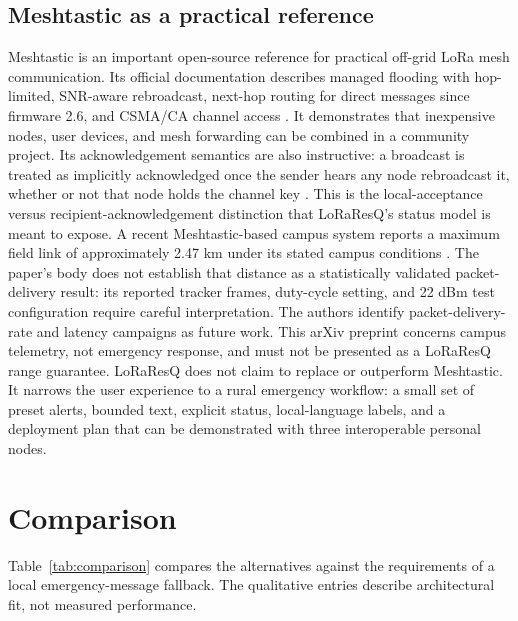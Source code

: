 \documentclass[journal]{IEEEtran}
\begin{document}
\subsection{Meshtastic as a practical reference}
Meshtastic is an important open-source reference for practical off-grid LoRa
mesh communication. Its official documentation describes managed flooding with
hop-limited, SNR-aware rebroadcast, next-hop routing for direct messages since
firmware 2.6, and CSMA/CA channel access \cite{meshtasticdocs}. It
demonstrates that inexpensive nodes, user devices, and mesh forwarding can be
combined in a community project. Its acknowledgement semantics are also
instructive: a broadcast is treated as implicitly acknowledged once the sender
hears any node rebroadcast it, whether or not that node holds the channel key
\cite{meshtasticdocs}. This is the local-acceptance versus
recipient-acknowledgement distinction that LoRaResQ's status model is meant to
expose. A recent Meshtastic-based campus system reports a maximum field link of
approximately 2.47 km under its stated campus conditions \cite{meshtastic2026}.
The paper's body does not establish that distance as a statistically
validated packet-delivery result: its reported tracker frames, duty-cycle
setting, and 22 dBm test configuration require careful interpretation. The
authors identify packet-delivery-rate and latency campaigns as future work.
This arXiv preprint concerns campus telemetry, not emergency response, and
must not be presented as a LoRaResQ range guarantee.
LoRaResQ does not claim to replace or outperform Meshtastic. It narrows the
user experience to a rural emergency workflow: a small set of preset alerts,
bounded text, explicit status, local-language labels, and a deployment plan
that can be demonstrated with three interoperable personal nodes.

\section{Comparison}
Table~\ref{tab:comparison} compares the alternatives against the requirements
of a local emergency-message fallback. The qualitative entries describe
architectural fit, not measured performance.
\end{document}
